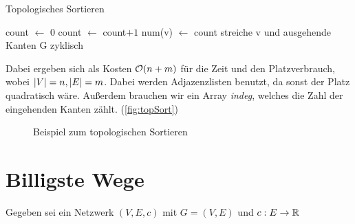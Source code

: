                     \begin{algorithm}
                    	\caption{Topologisches Sortieren}
                    	\label{alg:topologischesSortieren}
                    	\begin{algorithmic}
                    		\State count $\gets$ 0
                    			\State count $\gets$ count$ +1$
                    			\State num(v) $\gets$ count
                    			\State streiche v und ausgehende Kanten
                    		\EndWhile
                    			G zyklisch
                    		\EndIf
                    	\end{algorithmic}              
                    \end{algorithm}
                    
                    


                    Dabei ergeben sich als Kosten $\mathcal{O}(n+m)$ für die Zeit und den Platzverbrauch, wobei $\lvert V\rvert = n, \lvert E\rvert=m$. Dabei werden Adjazenzlisten benutzt, da sonst der Platz quadratisch wäre. Außerdem brauchen wir ein Array \emph{indeg}, welches die Zahl der eingehenden Kanten zählt.
                    (\autoref{fig:topSort})
                    
										
					\begin{figure}[htp]
						\capstart
						\centering
						
						\label{fig:topSort}
						\caption{Beispiel zum topologischen Sortieren}
					\end{figure}
                    
                    
            \section{Billigste Wege}
                Gegeben sei ein Netzwerk $(V,E,c)$ mit $G=(V,E)$ und $c: E \rightarrow \mathbb{R}$
                
